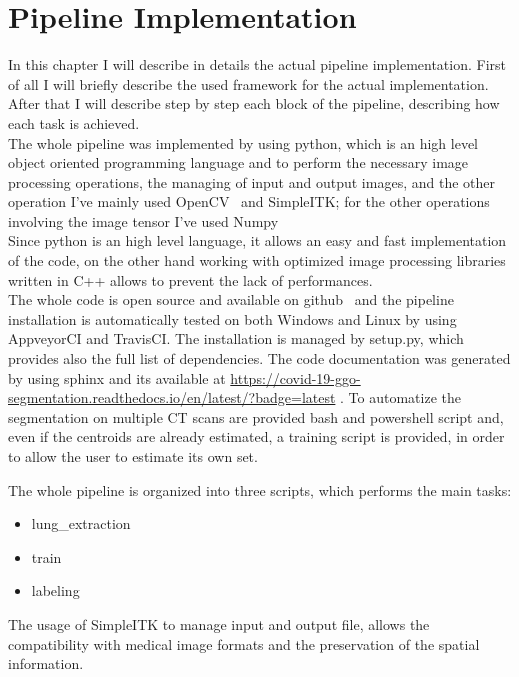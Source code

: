 
	
	\section{Pipeline Implementation}
	
	
	In this chapter I will describe in details the actual pipeline implementation. First of all I will briefly describe the used framework for the actual implementation. After that I will describe step by step each block of the pipeline, describing how each task is achieved.\\
	
	The whole pipeline was implemented by using python, which is an high level object oriented programming language and to perform the necessary image processing operations, the managing of input and output images, and the other operation I've mainly used OpenCV~\cite{OpenCV} and SimpleITK; for the other operations involving the image tensor I've used Numpy~\cite{Numpy}\\
	Since python is an high level language, it allows an easy and fast implementation of the code, on the other hand working with optimized image processing libraries written in C++ allows to prevent the lack of performances.\\
	
	The whole code is open source and available on github~\cite{REP:CTLungSeg} and the pipeline installation is automatically tested on both Windows and Linux by using AppveyorCI and TravisCI.  The installation is managed by setup.py, which provides also the full list of dependencies. The code documentation was generated by using sphinx and its available at \url{https://covid-19-ggo-segmentation.readthedocs.io/en/latest/?badge=latest} . To automatize the segmentation on multiple CT scans are provided bash and powershell script and,  even if the centroids are already estimated, a training script is provided, in order to allow the user to estimate its own set.
	
	The whole pipeline is organized into three scripts, which performs the main tasks: 
	\begin{itemize}
		\item lung\_extraction
		\item train
		\item labeling
	\end{itemize}
	
	The usage of SimpleITK to manage input and output file, allows the compatibility with medical image formats and the preservation of the spatial information.
 
